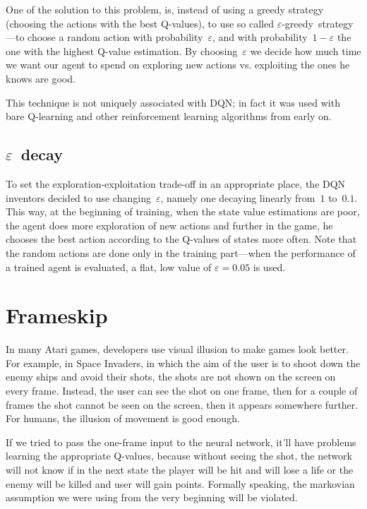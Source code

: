 One of the solution to this problem, is, instead of using a greedy strategy (choosing the actions with the best Q-values), to use so called $\varepsilon$-greedy~strategy---to choose a random action with probability~$\varepsilon$, and with probability~$1 - \varepsilon$ the one with the highest Q-value estimation. By choosing~$\varepsilon$ we decide how much time we want our agent to spend on exploring new actions vs. exploiting the ones he knows are good.

This technique is not uniquely associated with DQN; in fact it was used with bare Q-learning and other reinforcement learning algorithms from early on.

\subsection{$\varepsilon$~decay}
To set the exploration-exploitation trade-off in an appropriate place, the DQN inventors decided to use changing~$\varepsilon$, namely one decaying linearly from~$1$ to~$0.1$. This way, at the beginning of training, when the state value estimations are poor, the agent does more exploration of new actions and further in the game, he chooses the best action according to the Q-values of states more often. Note that the random actions are done only in the training part---when the performance of a trained agent is evaluated, a flat, low value of $\varepsilon=0.05$ is used.

\section{Frameskip}\label{dqn-frameskip}
In many Atari games, developers use visual illusion to make games look better. For example, in Space Invaders, in which the aim of the user is to shoot down the enemy ships and avoid their shots, the shots are not shown on the screen on every frame. Instead, the user can see the shot on one frame, then for a couple of frames the shot cannot be seen on the screen, then it appears somewhere further. For humans, the illusion of movement is good enough.

If we tried to pass the one-frame input to the neural network, it'll have problems learning the appropriate Q-values, because without seeing the shot, the network will not know if in the next state the player will be hit and will lose a life or the enemy will be killed and user will gain points. Formally speaking, the markovian assumption we were using from the very beginning will be violated.

